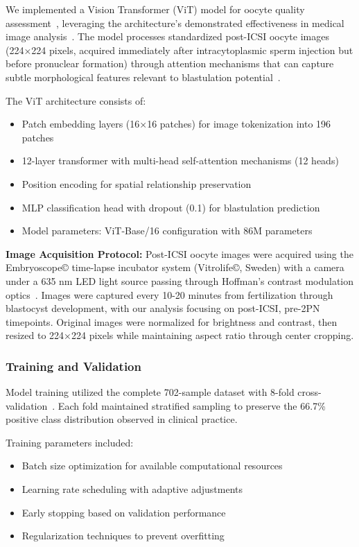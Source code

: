 We implemented a Vision Transformer (ViT) model for oocyte quality assessment~\cite{dosovitskiy2021image}, leveraging the architecture's demonstrated effectiveness in medical image analysis~\cite{alhammuri2023vision}. The model processes standardized post-ICSI oocyte images (224×224 pixels, acquired immediately after intracytoplasmic sperm injection but before pronuclear formation) through attention mechanisms that can capture subtle morphological features relevant to blastulation potential~\cite{zhang2021machine}.

The ViT architecture consists of:
\begin{itemize}
\item Patch embedding layers (16×16 patches) for image tokenization into 196 patches
\item 12-layer transformer with multi-head self-attention mechanisms (12 heads)
\item Position encoding for spatial relationship preservation
\item MLP classification head with dropout (0.1) for blastulation prediction
\item Model parameters: ViT-Base/16 configuration with 86M parameters
\end{itemize}

\textbf{Image Acquisition Protocol:} Post-ICSI oocyte images were acquired using the Embryoscope© time-lapse incubator system (Vitrolife©, Sweden) with a camera under a 635 nm LED light source passing through Hoffman's contrast modulation optics~\cite{gomez2022timelapse}. Images were captured every 10-20 minutes from fertilization through blastocyst development, with our analysis focusing on post-ICSI, pre-2PN timepoints. Original images were normalized for brightness and contrast, then resized to 224×224 pixels while maintaining aspect ratio through center cropping.

\subsubsection{Training and Validation}

Model training utilized the complete 702-sample dataset with 8-fold cross-validation~\cite{varoquaux2022machine}. Each fold maintained stratified sampling to preserve the 66.7\% positive class distribution observed in clinical practice.

Training parameters included:
\begin{itemize}
\item Batch size optimization for available computational resources
\item Learning rate scheduling with adaptive adjustments~\cite{kingma2015adam}
\item Early stopping based on validation performance
\item Regularization techniques to prevent overfitting
\end{itemize}

